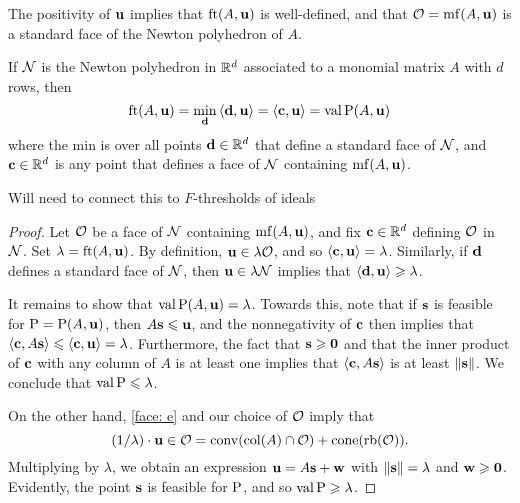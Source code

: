 \documentclass[11pt]{amsart}
\begin{document}
\begin{remark}  The positivity of $\mathbf{u}$ implies that $\operatorname{ft}(A, \mathbf{u})$ is well-defined, and that $\mathcal{O} = \operatorname{mf}(A, \mathbf{u})$ is a standard face of the Newton polyhedron of $A$.
\end{remark}

\begin{proposition}
\label{FT descriptions: P}
  If $\mathcal{N}$ is the Newton polyhedron in $\mathbb{R}^d$ associated to a monomial matrix $A$ with $d$ rows, then
\[ \operatorname{ft}(A, \mathbf{u}) = \min_{\mathbf{d}} \, \langle \mathbf{d}, \mathbf{u} \rangle = \langle \mathbf{c}, \mathbf{u} \rangle = \operatorname{val} \mathrm{P}(A, \mathbf{u}) \] where the min is over all points $\mathbf{d} \in \mathbb{R}^d$ that define a standard face of $\mathcal{N}$, and $\mathbf{c} \in \mathbb{R}^d$ is any point that defines a face of $\mathcal{N}$ containing $\operatorname{mf}(A, \mathbf{u})$. 
\end{proposition}

\alert[inline]{Will need to connect this to $F$-thresholds of ideals}

\begin{proof}
   Let $\mathcal{O}$ be a face of $\mathcal{N}$ containing $\operatorname{mf}(A,\mathbf{u})$, and fix $\mathbf{c} \in \mathbb{R}^d$ defining $\mathcal{O}$ in $\mathcal{N}$.
   Set $\lambda = \operatorname{ft}(A, \mathbf{u})$.
   By definition, $\mathbf{u} \in \lambda \mathcal{O}$, and so $\langle \mathbf{c}, \mathbf{u} \rangle = \lambda$.    Similarly, if $\mathbf{d}$ defines a standard face of $\mathcal{N}$, then $\mathbf{u} \in \lambda \mathcal{N}$ implies that $\langle \mathbf{d}, \mathbf{u} \rangle \geqslant \lambda$.

It remains to show that $\operatorname{val} \mathrm{P}(A, \mathbf{u}) = \lambda$.  Towards this, note that if $\mathbf{s}$ is feasible for $\mathrm{P} = \mathrm{P}(A, \mathbf{u})$, then $A \mathbf{s} \leqslant \mathbf{u}$, and the nonnegativity of $\mathbf{c}$ then implies that  $\langle \mathbf{c}, A \mathbf{s} \rangle \leqslant \langle \mathbf{c}, \mathbf{u} \rangle = \lambda$.  Furthermore, the fact that $\mathbf{s} \geqslant \mathbf{0}$ and that the inner product of $\mathbf{c}$ with any column of $A$ is at least one implies that $\langle \mathbf{c}, A \mathbf{s} \rangle$ is at least $\| \mathbf{s} \|$.  We conclude that $\operatorname{val} \mathrm{P} \leqslant \lambda$.  

On the other hand, \eqref{face: e} and our choice of $\mathcal{O}$ imply that 
\begin{equation}
\label{cone containment: e}
 (1/\lambda) \cdot \mathbf{u} \in \mathcal{O} = \operatorname{conv}(\operatorname{col}(A) \cap \mathcal{O}) + \operatorname{cone}(\operatorname{rb}(\mathcal{O})).
\end{equation}
Multiplying by $\lambda$, we obtain an expression $\mathbf{u} = A \mathbf{s} + \mathbf{w}$ with $\| \mathbf{s} \| = \lambda$ and $\mathbf{w} \geqslant \mathbf{0}$.
Evidently, the point $\mathbf{s}$ is feasible for $\mathrm{P}$, and so $\operatorname{val} \mathrm{P} \geqslant \lambda$.
\end{proof}
\end{document}
